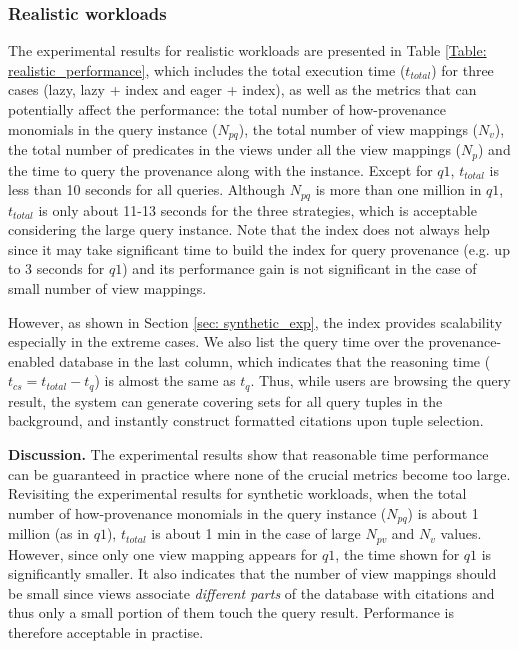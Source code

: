 \vspace*{-0.3cm}

\subsubsection{Realistic workloads}
\label{ssec: realistic}
The experimental results for realistic workloads are presented in Table \ref{Table: realistic_performance}, which includes the total execution time ($t_{total}$) for three cases (lazy, lazy + index and eager + index), as well as the metrics that can potentially affect the performance: the total number of how-provenance monomials in the query instance ($N_{pq}$), the total number of view mappings ($N_v$), the total number of predicates in the views under all the view mappings ($N_p$) and the time to query the provenance along with the instance. Except for $q1$, $t_{total}$ is less than 10 seconds for all queries. Although $N_{pq}$ is more than one million in $q1$, $t_{total}$ is only about 11-13 seconds for the three strategies, which is acceptable considering the large query instance. Note that the index does not always help since it may take significant time to build the index for query provenance (e.g. up to 3 seconds for $q1$) and its performance gain is not significant in the case of small number of view mappings.

However, as shown in Section \ref{sec: synthetic_exp}, the index provides  scalability especially in the extreme cases. We also list the query time over the provenance-enabled database in the last column, which indicates that the reasoning time ($t_{cs} = t_{total} - t_{q}$) is almost the same as $t_{q}$. Thus, while users are browsing the query result, the system can generate covering sets for all query tuples in the background, and instantly construct formatted citations upon tuple selection.


{\bf Discussion.} The experimental results show that reasonable time performance can be guaranteed in practice where none of the crucial metrics become too large.  Revisiting the experimental results for synthetic workloads, when the total number of how-provenance monomials in the query instance ($N_{pq}$) is about 1 million (as in $q1$), $t_{total}$ is about 1 min in the case of large $N_{pv}$ and $N_v$ values. However, since only one view mapping appears for $q1$, the time shown for $q1$ is  significantly smaller.  It also indicates that the number of view mappings should be small since views associate \textit{different parts} of the database with citations and thus only a small portion of them touch the query result. Performance is therefore acceptable in practise.